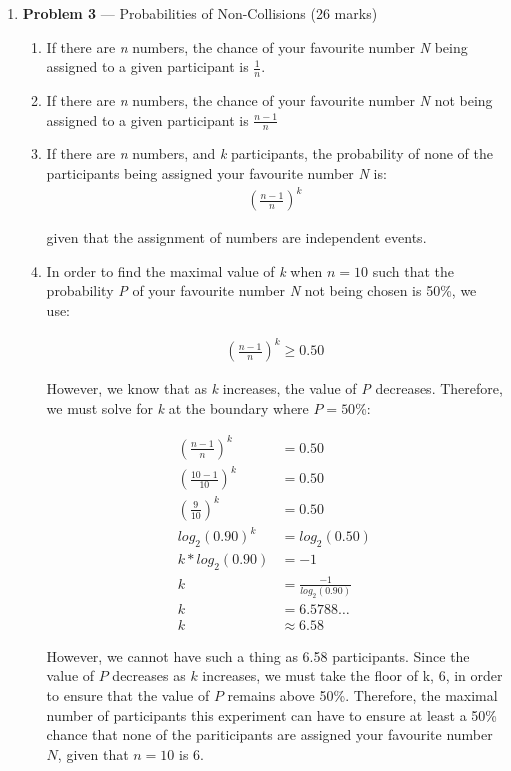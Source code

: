 \documentclass[11pt]{article}
\theoremstyle{definition}
\begin{document}
\begin{enumerate}
\item[] \textbf{Problem 3} --- Probabilities of Non-Collisions (26 marks)

\begin{enumerate}
\item If there are \textit{n} numbers, the chance of your favourite number \textit{N} being assigned to a given participant is $\frac{1}{n}$.

\item If there are \textit{n} numbers, the chance of your favourite number \textit{N} not being assigned to a given participant is $\frac{n-1}{n}$

\item If there are \textit{n} numbers, and \textit{k} participants, the probability of none of the participants being assigned your favourite number \textit{N} is:
\begin{align*}
( \frac{n-1}{n})^k
\end{align*}

given that the assignment of numbers are independent events.

\item In order to find the maximal value of \textit{k} when $n = 10$ such that the probability \textit{P} of your favourite number \textit{N} not being chosen is 50\%, we use:

\begin{align*}
( \frac{n-1}{n})^k \geq 0.50
\end{align*}

However, we know that as \textit{k} increases, the value of \textit{P} decreases. Therefore, we must solve for \textit{k} at the boundary where $P = 50$\%:

\begin{align*}
( \frac{n-1}{n})^k &= 0.50 \\
( \frac{10-1}{10})^k &= 0.50 \\
( \frac{9}{10})^k &= 0.50 \\
log_2(0.90)^k &= log_2(0.50) \\
k*log_2(0.90) &= -1 \\
k &= \frac{-1}{log_2(0.90)} \\
k &= 6.5788\ldots \\
k &\approx 6.58
\end{align*}

However, we cannot have such a thing as 6.58 participants. Since the value of $P$ decreases as $k$ increases, we must take the floor of k, 6, in order to ensure that the value
of $P$ remains above 50\%. Therefore, the maximal number of participants this experiment can have to ensure at least a 50\% chance that none of the pariticipants are
assigned your favourite number $N$, given that $n = 10$ is 6.


\end{enumerate}
\end{enumerate}
\end{document}
